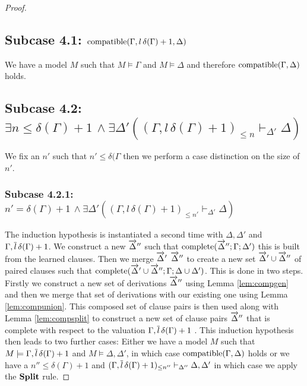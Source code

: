 \begin{mytheorem}
\begin{proof}
\subsection*{Subcase 4.1: $\mathrm{compatible}(\Gamma, l \, \delta(\Gamma) + 1,\Delta)$}
We have a model $M$ such that $M \models \Gamma$ and $M \models \Delta$ and therefore $\mathrm{compatible}(\Gamma,\Delta)$ holds.
%
\subsection*{Subcase 4.2: $ \exists n \leq \delta(\Gamma) + 1 \, \wedge  \exists \Delta' ( (\Gamma, l \, \delta(\Gamma) + 1)_{ \leq n}  \vdash_{\Delta'} \Delta)$}
We fix an $n'$ such that $n' \leq \delta(\Gamma$ then we perform a case distinction on the size of $n'$.
%
\subsubsection*{Subcase 4.2.1: $  n' = \delta(\Gamma) + 1 \, \wedge  \exists \Delta' ( (\Gamma, l \, \delta(\Gamma) + 1) _{\leq n'}  \vdash_{\Delta'} \Delta)$}
The induction hypothesis is instantiated a second time with $\Delta, \Delta'$ and $\Gamma, \overline{l} \, \delta(\Gamma) + 1$. We construct a new $\overrightarrow{\Delta}''$ such that $\mathrm{complete}(\overrightarrow{\Delta}'';\Gamma; \Delta')$ this is built from the learned clauses. Then we merge $\overrightarrow{\Delta}'$ $\overrightarrow{\Delta}''$ to create a new set $\overrightarrow{\Delta}' \cup \overrightarrow{\Delta}''$ of paired clauses such that $\mathrm{complete}(\overrightarrow{\Delta}' \cup \overrightarrow{\Delta}'';\Gamma; \Delta \cup \Delta')$. This is done in two steps. Firstly we construct a new set of derivations $\overrightarrow{\Delta}''$ using Lemma \ref{lem:compgen} and then we merge that set of derivations with our existing one using Lemma \ref{lem:compunion}. This composed set of clause pairs is then used  along with Lemma \ref{lem:compsplit} to construct a new set of clause pairs $\overrightarrow{\Delta}''$ that is complete with respect to the valuation $\Gamma, \overline{l} \, \delta(\Gamma) + 1$ .  This induction hypothesis then leads to two further cases: Either we have a model $M$ such that $M \models \Gamma, \overline{l} \, \delta(\Gamma) + 1$ and $M \models \Delta, \Delta'$, in which case $\mathrm{compatible}(\Gamma,\Delta)$ holds or we have a $n'' \leq \delta(\Gamma) + 1$ and $(\Gamma, \overline{l} \, \delta(\Gamma) + 1)_{\leq n''} \vdash_{\Delta''} \Delta, \Delta'$ in which case we apply the $\mathbf{Split}$ rule.
\begin{comment}
\textbf{We need to know that all of the learned clauses in $\Delta'$ are derivable from $\Gamma$ and $\Delta$ otherwise they are useless as the $\Conflict$ could not be applied to them. We know that they can be derived from some $\Gamma$ and $\Delta$ but how do we know that they are derivable from the current $\Gamma$ since it could be the case that backtracking has occured and there is now a smaller $\Gamma$.}
\end{comment}
%

\end{proof}
\end{mytheorem}
